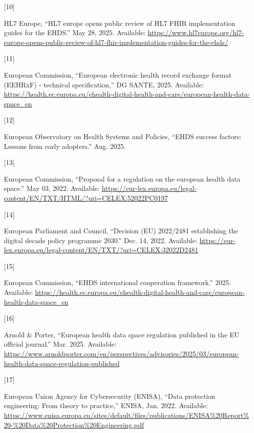 \documentclass[
  a4paper,
  a4paper,
  11pt]{ltjsbook}
\newlength{\cslhangindent}
\newlength{\csllabelwidth}
\newenvironment{CSLReferences}[2] %
 {\begin{list}{}{%
  \setlength{\itemindent}{0pt}
  \setlength{\leftmargin}{0pt}
  \setlength{\parsep}{0pt}
  \ifodd #1
   \setlength{\leftmargin}{\cslhangindent}
   \setlength{\itemindent}{-1\cslhangindent}
  \fi
  \setlength{\itemsep}{#2\baselineskip}}}
 {\end{list}}
\newcommand{\CSLLeftMargin}[1]{\parbox[t]{\csllabelwidth}{\strut#1\strut}}
\newcommand{\CSLRightInline}[1]{\parbox[t]{\linewidth - \csllabelwidth}{\strut#1\strut}}
\begin{document}
\begin{CSLReferences}{0}{0}
\CSLLeftMargin{{[}10{]} }%
\CSLRightInline{HL7 Europe, {``HL7 europe opens public review of HL7
FHIR implementation guides for the EHDS.''} May 28, 2025. Available:
\url{https://www.hl7europe.org/hl7-europe-opens-public-review-of-hl7-fhir-implementation-guides-for-the-ehds/}}

\CSLLeftMargin{{[}11{]} }%
\CSLRightInline{European Commission, {``European electronic health
record exchange format (EEHRxF) - technical specification,''} DG SANTE,
2025. Available:
\url{https://health.ec.europa.eu/ehealth-digital-health-and-care/european-health-data-space_en}}

\CSLLeftMargin{{[}12{]} }%
\CSLRightInline{European Observatory on Health Systems and Policies,
{``EHDS success factors: Lessons from early adopters.''} Aug. 2025.}

\CSLLeftMargin{{[}13{]} }%
\CSLRightInline{European Commission, {``Proposal for a regulation on the
european health data space.''} May 03, 2022. Available:
\url{https://eur-lex.europa.eu/legal-content/EN/TXT/HTML/?uri=CELEX:52022PC0197}}

\CSLLeftMargin{{[}14{]} }%
\CSLRightInline{European Parliament and Council, {``Decision (EU)
2022/2481 establishing the digital decade policy programme 2030.''} Dec.
14, 2022. Available:
\url{https://eur-lex.europa.eu/legal-content/EN/TXT/?uri=CELEX:32022D2481}}

\CSLLeftMargin{{[}15{]} }%
\CSLRightInline{European Commission, {``EHDS international cooperation
framework.''} 2025. Available:
\url{https://health.ec.europa.eu/ehealth-digital-health-and-care/european-health-data-space_en}}

\CSLLeftMargin{{[}16{]} }%
\CSLRightInline{Arnold \& Porter, {``European health data space
regulation published in the EU official journal.''} Mar. 2025.
Available:
\url{https://www.arnoldporter.com/en/perspectives/advisories/2025/03/european-health-data-space-regulation-published}}

\CSLLeftMargin{{[}17{]} }%
\CSLRightInline{European Union Agency for Cybersecurity (ENISA), {``Data
protection engineering: From theory to practice,''} ENISA, Jan. 2022.
Available:
\url{https://www.enisa.europa.eu/sites/default/files/publications/ENISA\%20Report\%20-\%20Data\%20Protection\%20Engineering.pdf}}


\end{CSLReferences}
\end{document}
